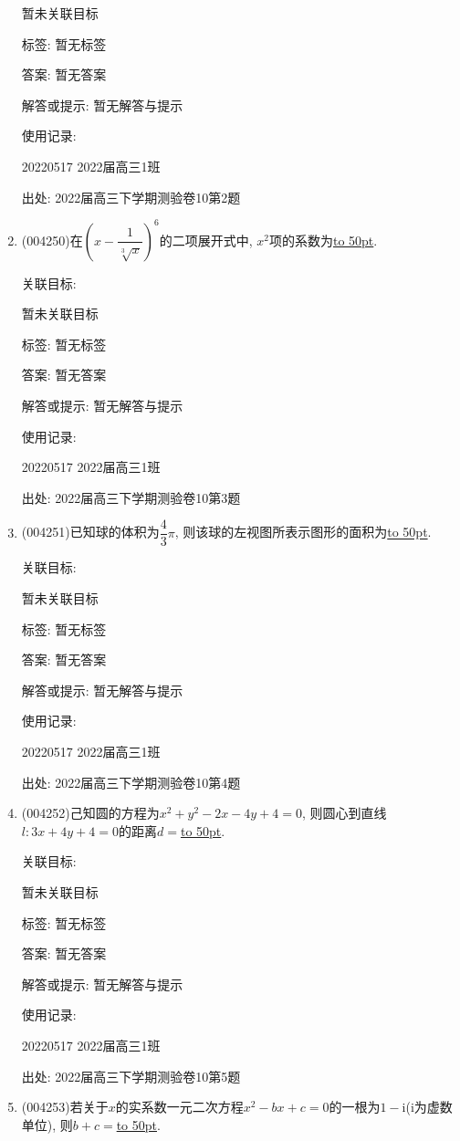 \documentclass[10pt,a4paper]{article}
\newcommand{\blank}[1]{\underline{\hbox to #1pt{}}}
\begin{document}
\begin{enumerate}[1.]
暂未关联目标



标签: 暂无标签

答案: 暂无答案

解答或提示: 暂无解答与提示

使用记录:

20220517	2022届高三1班	


出处: 2022届高三下学期测验卷10第2题
\item { (004250)}在$(x-\dfrac 1{\sqrt[3]x})^6$的二项展开式中, $x^2$项的系数为\blank{50}.


关联目标:

暂未关联目标



标签: 暂无标签

答案: 暂无答案

解答或提示: 暂无解答与提示

使用记录:

20220517	2022届高三1班	


出处: 2022届高三下学期测验卷10第3题
\item { (004251)}已知球的体积为$\dfrac 43\pi$, 则该球的左视图所表示图形的面积为\blank{50}.


关联目标:

暂未关联目标



标签: 暂无标签

答案: 暂无答案

解答或提示: 暂无解答与提示

使用记录:

20220517	2022届高三1班	


出处: 2022届高三下学期测验卷10第4题
\item { (004252)}己知圆的方程为$x^2+y^2-2x-4y+4=0$, 则圆心到直线$l:3x+4y+4=0$的距离$d=$\blank{50}.


关联目标:

暂未关联目标



标签: 暂无标签

答案: 暂无答案

解答或提示: 暂无解答与提示

使用记录:

20220517	2022届高三1班	


出处: 2022届高三下学期测验卷10第5题
\item { (004253)}若关于$x$的实系数一元二次方程$x^2-bx+c=0$的一根为$1-\mathrm{i}$($\mathrm{i}$为虚数单位), 则$b+c=$\blank{50}.



\end{enumerate}
\end{document}
